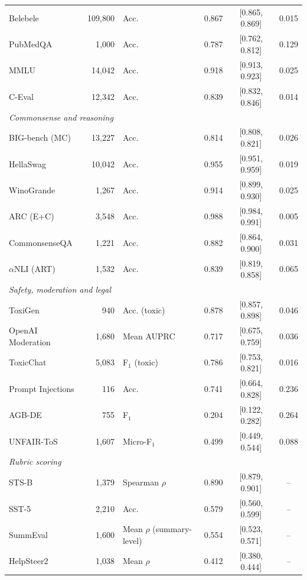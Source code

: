 \begin{tabular}{l r l c c c}
    \rowcolor{gray!10}Belebele & 109{,}800 & Acc. & 0.867 & [0.865, 0.869] & 0.015 \\
    PubMedQA & 1{,}000 & Acc. & 0.787 & [0.762, 0.812] & 0.129 \\
    \rowcolor{gray!10}MMLU & 14{,}042 & Acc. & 0.918 & [0.913, 0.923] & 0.025 \\
    C-Eval & 12{,}342 & Acc. & 0.839 & [0.832, 0.846] & 0.014 \\
    \midrule
    \multicolumn{6}{l}{\textit{Commonsense and reasoning}} \\
    BIG-bench (MC) & 13{,}227 & Acc. & 0.814 & [0.808, 0.821] & 0.026 \\
    \rowcolor{gray!10}HellaSwag & 10{,}042 & Acc. & 0.955 & [0.951, 0.959] & 0.019 \\
    WinoGrande & 1{,}267 & Acc. & 0.914 & [0.899, 0.930] & 0.025 \\
    \rowcolor{gray!10}ARC (E+C) & 3{,}548 & Acc. & 0.988 & [0.984, 0.991] & 0.005 \\
    CommonsenseQA & 1{,}221 & Acc. & 0.882 & [0.864, 0.900] & 0.031 \\
    \rowcolor{gray!10}$\alpha$NLI (ART) & 1{,}532 & Acc. & 0.839 & [0.819, 0.858] & 0.065 \\
    \midrule
    \multicolumn{6}{l}{\textit{Safety, moderation and legal}} \\
    ToxiGen & 940 & Acc. (toxic) & 0.878 & [0.857, 0.898] & 0.046 \\
    \rowcolor{gray!10}OpenAI Moderation & 1{,}680 & Mean AUPRC & 0.717 & [0.675, 0.759] & 0.036 \\
    ToxicChat & 5{,}083 & F$_\text{1}$ (toxic) & 0.786 & [0.753, 0.821] & 0.016 \\
    \rowcolor{gray!10}Prompt Injections & 116 & Acc. & 0.741 & [0.664, 0.828] & 0.236 \\
    AGB-DE & 755 & F$_\text{1}$ & 0.204 & [0.122, 0.282] & 0.264 \\
    \rowcolor{gray!10}UNFAIR-ToS & 1{,}607 & Micro-F$_\text{1}$ & 0.499 & [0.449, 0.544] & 0.088 \\
    \midrule
    \multicolumn{6}{l}{\textit{Rubric scoring}} \\
    STS-B & 1{,}379 & Spearman $\rho$ & 0.890 & [0.879, 0.901] & -- \\
    \rowcolor{gray!10}SST-5 & 2{,}210 & Acc. & 0.579 & [0.560, 0.599] & -- \\
    SummEval & 1{,}600 & Mean $\rho$ (summary-level) & 0.554 & [0.523, 0.571] & -- \\
    \rowcolor{gray!10}HelpSteer2 & 1{,}038 & Mean $\rho$ & 0.412 & [0.380, 0.444] & -- \\
    \bottomrule
\end{tabular}
